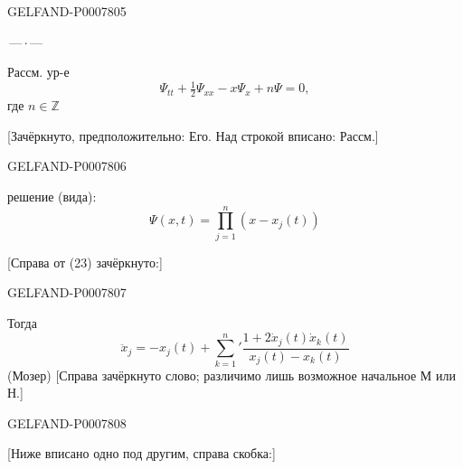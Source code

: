 \begin{GelfandAdjacentEvidence}{GELFAND-P000780}{5}


\begin{center}\(\text{---}\,\cdot\,\text{---}\)\end{center}

Рассм. ур-е
\begin{equation}
\Psi_{tt}+\tfrac12\Psi_{xx}-x\Psi_x+n\Psi=0,\tag{22}
\end{equation}
где \(n\in\mathbb Z\)

[Зачёркнуто, предположительно: Его. Над строкой вписано: Рассм.]
\end{GelfandAdjacentEvidence}
\begin{GelfandAdjacentEvidence}{GELFAND-P000780}{6}

решение (вида):
\begin{equation}
\Psi(x,t)=\prod_{j=1}^n(x-x_j(t))\tag{23}
\end{equation}

[Справа от (23) зачёркнуто:]
\end{GelfandAdjacentEvidence}
\begin{GelfandAdjacentEvidence}{GELFAND-P000780}{7}


Тогда
\begin{equation}
\ddot x_j=-x_j(t)+\sum_{k=1}^n{}'
\frac{1+2\dot x_j(t)\dot x_k(t)}{x_j(t)-x_k(t)}
\tag{24}
\end{equation}
(Мозер)
[Справа зачёркнуто слово; различимо лишь возможное начальное М или Н.]
\end{GelfandAdjacentEvidence}
\begin{GelfandAdjacentEvidence}{GELFAND-P000780}{8}


[Ниже вписано одно под другим, справа скобка:]
\end{GelfandAdjacentEvidence}
